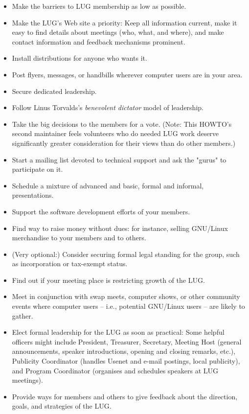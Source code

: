 \documentclass{HOWTO}
\begin{document}
\begin{itemize}
\item Make the barriers to LUG membership as low as possible.
\item Make the LUG's Web site a priority: Keep all information current, make it easy to find details about meetings (who, what, and where), and make contact information and feedback mechanisms prominent.
\item Install distributions for anyone who wants it.
\item Post flyers, messages, or handbills wherever computer users are in your area.
\item Secure dedicated leadership.
\item Follow Linus Torvalds's {\itshape benevolent dictator\/} model of leadership.
\item Take the big decisions to the members for a vote.  (Note:  This HOWTO's second maintainer feels volunteers who do needed LUG work deserve significantly greater consideration for their views than do other members.)
\item Start a mailing list devoted to technical support and ask the "gurus" to participate on it.
\item Schedule a mixture of advanced and basic, formal and informal, presentations.
\item Support the software development efforts of your members.
\item Find way to raise money without dues: for instance, selling GNU/Linux merchandise to your members and to others.
\item (Very optional:)  Consider securing formal legal standing for the group, such as incorporation or tax-exempt status.
\item Find out if your meeting place is restricting growth of the LUG.
\item Meet in conjunction with swap meets, computer shows, or other community events where computer users -- i.e., potential GNU/Linux users -- are likely to gather.
\item Elect formal leadership for the LUG as soon as practical: Some helpful officers might include President, Treasurer, Secretary, Meeting Host (general announcements, speaker introductions, opening and closing remarks, etc.), Publicity Coordinator (handles Usenet and e-mail postings, local publicity), and Program Coordinator (organises and schedules speakers at LUG meetings).
\item Provide ways for members and others to give feedback about the direction, goals, and strategies of the LUG.

\end{itemize}
\end{document}
